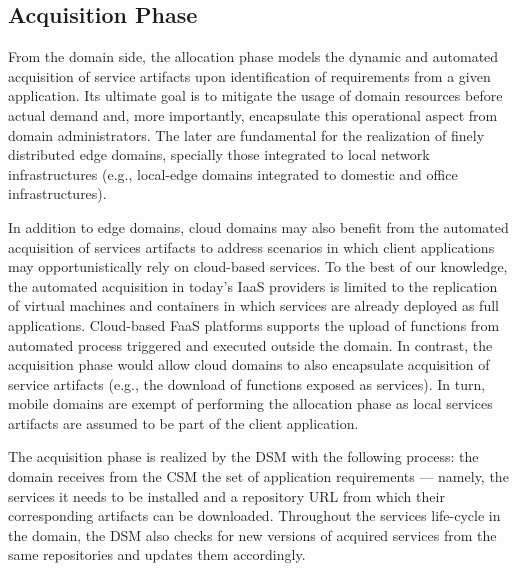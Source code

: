


\subsection{Acquisition Phase}\label{sec:A3-E-acquisition}


From the domain side, the allocation phase models the dynamic and automated acquisition of service artifacts upon identification of requirements from a given application. Its ultimate goal is to mitigate the usage of domain resources before actual demand and, more importantly, encapsulate this operational aspect from domain administrators. The later are fundamental for the realization of finely distributed edge domains, specially those integrated to local network infrastructures (e.g., local-edge domains integrated to domestic and office infrastructures).

In addition to edge domains, cloud domains may also benefit from the automated acquisition of services artifacts to address scenarios in which client applications may opportunistically rely on cloud-based services. To the best of our knowledge, the automated acquisition in today's IaaS providers is limited to the replication of virtual machines and containers in which services are already deployed as full applications. Cloud-based FaaS platforms supports the upload of functions from automated process triggered and executed outside the domain. In contrast, the acquisition phase would allow cloud domains to also encapsulate acquisition of service artifacts (e.g., the download of functions exposed as services). In turn, mobile domains are exempt of performing the allocation phase as local services artifacts are assumed to be part of the client application.

The acquisition phase is realized by the DSM with the following process: the domain receives from the CSM the set of application requirements --- namely, the services it needs to be installed and a repository URL from which their corresponding artifacts can be downloaded. Throughout the services life-cycle in the domain, the DSM also checks for new versions of acquired services from the same repositories and updates them accordingly. 

